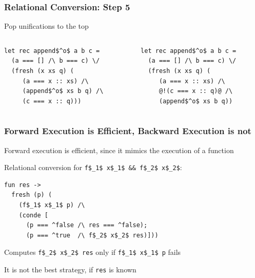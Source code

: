 \documentclass[xcolor=table]{beamer}
\begin{document}
\begin{frame}[fragile]
  \transwipe[direction=90]
  \frametitle{Relational Conversion: Step 5}
  
Pop unifications to the top

\begin{columns}
\begin{column}{0.5\textwidth}
\begin{lstlisting}
let rec append$^o$ a b c =
  (a === [] /\ b === c) \/
  (fresh (x xs q) (
     (a === x :: xs) /\
     (append$^o$ xs b q) /\
     (c === x :: q)))
\end{lstlisting}
\end{column}
\begin{column}{0.5\textwidth}  
\begin{lstlisting}
let rec append$^o$ a b c =
  (a === [] /\ b === c) \/
  (fresh (x xs q) (
     (a === x :: xs) /\
     @!(c === x :: q)@ /\
     (append$^o$ xs b q))
\end{lstlisting}
\end{column}
\end{columns}
\end{frame}


\begin{frame}[fragile]
  \transwipe[direction=90]
  \frametitle{Forward Execution is Efficient, Backward Execution is not}
  
  Forward execution is efficient, since it mimics the execution of a function
  
\vspace{6pt}  
  
Relational conversion for \lstinline{f$_1$ x$_1$ && f$_2$ x$_2$}: 
 
\begin{lstlisting}
fun res ->
  fresh (p) (
    (f$_1$ x$_1$ p) /\
    (conde [
      (p === ^false /\ res === ^false);
      (p === ^true  /\ f$_2$ x$_2$ res)]))
\end{lstlisting} 

Computes \lstinline{f$_2$ x$_2$ res} only if \lstinline{f$_1$ x$_1$ p} fails

\vspace{6pt}

It is not the best strategy, if \lstinline{res} is known

\end{frame}
\end{document}
